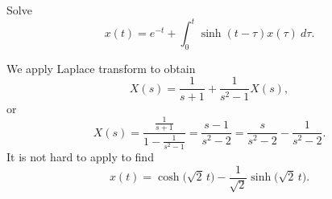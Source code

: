 \documentclass{ximera}
\begin{document}
\begin{example}
    Solve
    \begin{equation*}
        x(t) =  e^{-t} + \int_0^t \sinh(t-\tau) x(\tau) ~ d\tau .
    \end{equation*}
\end{example}

\begin{exampleSol}
    We apply Laplace transform to obtain
    \begin{equation*}
        X(s) = \frac{1}{s+1} + \frac{1}{s^2-1} X(s) ,
    \end{equation*}
    or
    \begin{equation*}
        X(s) = \frac{\frac{1}{s+1}}{1- \frac{1}{s^2-1}} = \frac{s-1}{s^2 - 2} = \frac{s}{s^2 - 2} - \frac{1}{s^2 - 2} .
    \end{equation*}
    It is not hard to apply  to find
    \begin{equation*}
        x(t) = \cosh \bigl( \sqrt{2} \, t \bigr) - \frac{1}{\sqrt{2}} \sinh \bigl( \sqrt{2}\, t \bigr).
    \end{equation*}
\end{exampleSol}
\end{document}
